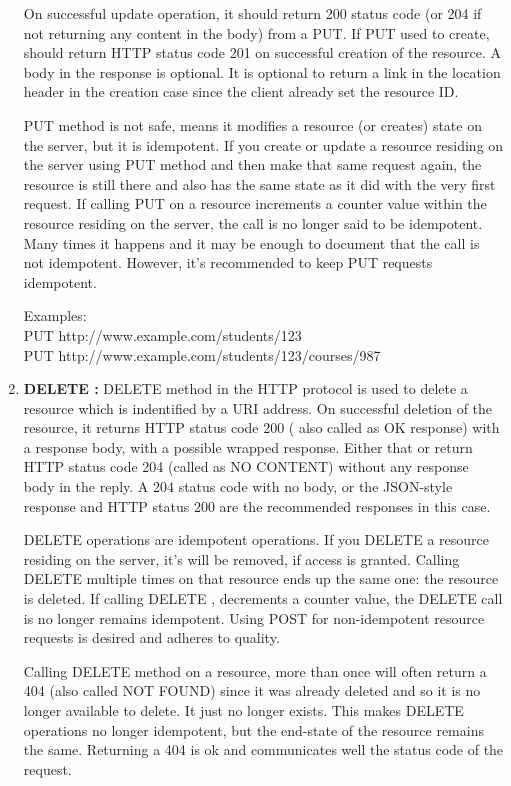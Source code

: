\begin{enumerate}
\hspace*{0.2in}On successful update operation, it should return 200 status code (or 204 if not returning any content in the body) from a PUT. If PUT used to create, should return HTTP status code 201 on successful creation of the resource. A body in the response is optional. It is optional to return a link in the location header in the creation case since the client already set the resource ID.

\hspace*{0.2in}PUT method is not safe, means it modifies a resource (or creates) state on the server, but it is idempotent. If you create or update a resource residing on the server using PUT method and then make that same request again, the resource is still there and also has the same state as it did with the very first request. If calling PUT on a resource increments a counter  value within the resource residing on the server, the call is no longer said to be idempotent. Many times it happens and it may be enough to document that the call is not idempotent. However, it's recommended to keep PUT requests idempotent.

Examples:\\
PUT http://www.example.com/students/123\\
PUT http://www.example.com/students/123/courses/987\\


\item \textbf{DELETE : } DELETE method in the HTTP protocol is used to delete a resource which is indentified by a URI address. On successful deletion of the resource, it returns HTTP status code 200 ( also called as OK response) with a response body, with a possible wrapped response. Either that or return HTTP status code 204 (called as NO CONTENT) without any response body in the reply. A 204 status code with no body, or the JSON-style response and HTTP status 200 are the recommended responses in this case.

\hspace*{0.2in}DELETE operations are idempotent operations. If you DELETE a resource residing on the server, it's will be removed, if access is granted. Calling DELETE multiple times on that resource ends up the same one: the resource is deleted. If calling DELETE , decrements a counter value, the DELETE call is no longer remains idempotent. Using POST for non-idempotent resource requests is desired and adheres to quality.

\hspace*{0.2in} Calling DELETE method on a resource, more than once will often return a 404 (also called NOT FOUND) since it was already deleted and so it is no longer available to delete. It just no longer exists. This makes DELETE operations no longer idempotent, but the end-state of the resource remains the same. Returning a 404 is ok and communicates well the status code of the request.


\end{enumerate}
